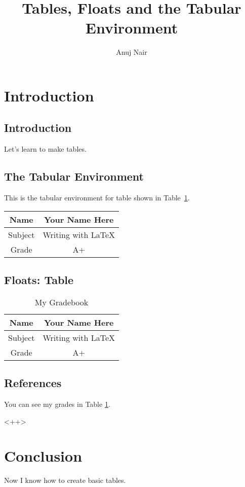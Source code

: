 \documentclass{article}
\title{Tables, Floats and the Tabular Environment}
\author{Anuj Nair}
\date{}
\begin{document}
\maketitle

\section{Introduction}

\subsection{Introduction}

Let's learn to make tables.

\subsection{The Tabular Environment}
This is the tabular environment for table shown in Table~\ref{tab:grades}.

\vspace{0.5cm}

\begin{tabular}{|c||c|}
\hline		
  Name & Your Name Here \\  
\hline
  Subject & Writing with {\LaTeX} \\
\hline
  Grade & A+ \\
\hline
\end{tabular}

\subsection{Floats: Table}

\begin{table}[htbp]
				\caption{My Gradebook}
				\begin{center}
								\begin{tabular}{|c||c|}
								\hline		
									Name & Your Name Here \\  
								\hline
									Subject & Writing with {\LaTeX} \\
								\hline
									Grade & A+ \\
								\hline
								\end{tabular}

				\end{center}
				\label{tab:grades}
\end{table}

\subsection{References}


  You can see my grades in Table \ref{tab:grades}.

  

<++>






\section{Conclusion}

  Now I know how to create basic tables.
\end{document}
